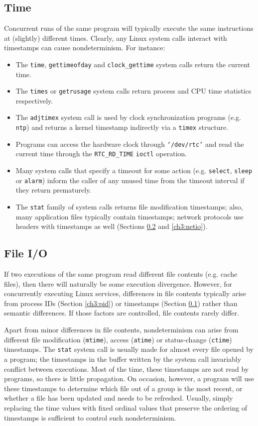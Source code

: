 \subsection{Time} \label{ch3:time}
Concurrent runs of the same program will typically
execute the same instructions at (slightly) different times.
Clearly, any Linux system calls interact with timestamps
can cause nondeterminism. For instance:
\begin{itemize}
\item The \texttt{time}, \texttt{gettimeofday} and \texttt{clock\_gettime}
 system calls return the current time.
\item The \texttt{times} or \texttt{getrusage} system calls
return process and CPU time statistics respectively.
\item The \texttt{adjtimex} system call is used 
by clock synchronization programs (e.g. \texttt{ntp}) 
and returns a kernel timestamp indirectly via 
a \texttt{timex} structure.
\item Programs can access the hardware clock
through \texttt{`/dev/rtc'} and read the current time
through the \texttt{RTC\_RD\_TIME} \texttt{ioctl}
operation.
\item Many system calls that specify a timeout
for some action (e.g. \texttt{select}, \texttt{sleep} or \texttt{alarm})
inform the caller of any unused time from the timeout interval if they
return prematurely.
\item The \texttt{stat} family of system calls returns file
  modification timestamps; also, many application files typically contain timestamps;
  network protocols use headers with timestamps as well (Sections \ref{ch3:fileio}
  and \ref{ch3:netio}).
\end{itemize}

\subsection{File I/O} \label{ch3:fileio}
If two executions of the same program read different
file contents (e.g. cache files), then
there will naturally be some execution divergence.
However, for concurrently executing Linux services,
differences in file contents typically arise
from process IDs (Section \ref{ch3:pid}) or timestamps (Section \ref{ch3:time})
rather than semantic differences.
If those factors are controlled, file contents rarely differ.

Apart from minor differences in file contents,
nondeterminism can arise from different file 
modification (\texttt{mtime}), access (\texttt{atime}) or status-change (\texttt{ctime})
timestamps.
The \texttt{stat} system call is usually made for almost
every file opened by a program; the timestamps
in the buffer written by the system call invariably
conflict between executions. Most of the time,
these timestamps are not read by programs,
so there is little propagation. On occasion, 
however, a program will use these timestamps
to determine which file out of a group is the most recent, 
or whether a file has been updated
and needs to be refreshed. Usually, simply
replacing the time values with fixed ordinal values
that preserve the ordering of timestamps is sufficient
to control such nondeterminism.

